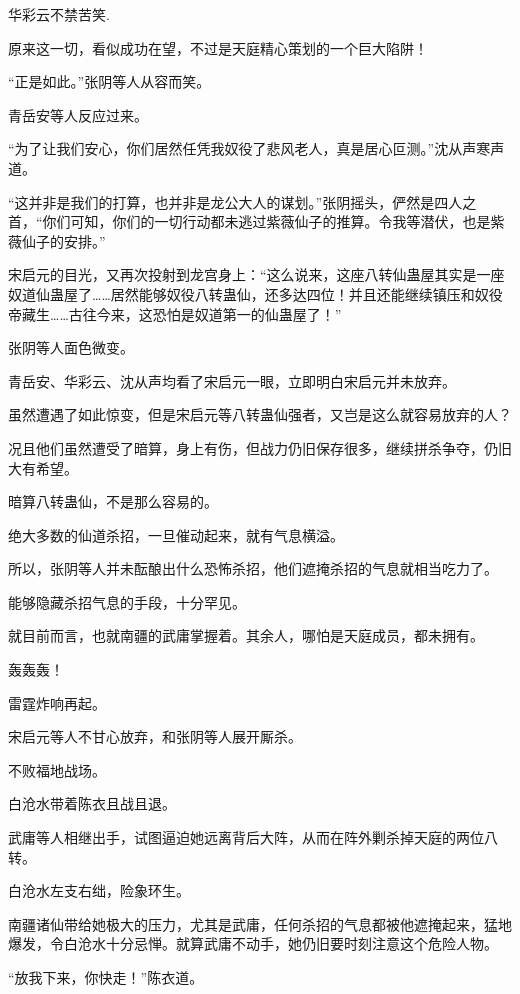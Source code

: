 
\begin{this_body}

华彩云不禁苦笑.

原来这一切，看似成功在望，不过是天庭精心策划的一个巨大陷阱！

“正是如此。”张阴等人从容而笑。

青岳安等人反应过来。

“为了让我们安心，你们居然任凭我奴役了悲风老人，真是居心叵测。”沈从声寒声道。

“这并非是我们的打算，也并非是龙公大人的谋划。”张阴摇头，俨然是四人之首，“你们可知，你们的一切行动都未逃过紫薇仙子的推算。令我等潜伏，也是紫薇仙子的安排。”

宋启元的目光，又再次投射到龙宫身上：“这么说来，这座八转仙蛊屋其实是一座奴道仙蛊屋了……居然能够奴役八转蛊仙，还多达四位！并且还能继续镇压和奴役帝藏生……古往今来，这恐怕是奴道第一的仙蛊屋了！”

张阴等人面色微变。

青岳安、华彩云、沈从声均看了宋启元一眼，立即明白宋启元并未放弃。

虽然遭遇了如此惊变，但是宋启元等八转蛊仙强者，又岂是这么就容易放弃的人？

况且他们虽然遭受了暗算，身上有伤，但战力仍旧保存很多，继续拼杀争夺，仍旧大有希望。

暗算八转蛊仙，不是那么容易的。

绝大多数的仙道杀招，一旦催动起来，就有气息横溢。

所以，张阴等人并未酝酿出什么恐怖杀招，他们遮掩杀招的气息就相当吃力了。

能够隐藏杀招气息的手段，十分罕见。

就目前而言，也就南疆的武庸掌握着。其余人，哪怕是天庭成员，都未拥有。

轰轰轰！

雷霆炸响再起。

宋启元等人不甘心放弃，和张阴等人展开厮杀。

不败福地战场。

白沧水带着陈衣且战且退。

武庸等人相继出手，试图逼迫她远离背后大阵，从而在阵外剿杀掉天庭的两位八转。

白沧水左支右绌，险象环生。

南疆诸仙带给她极大的压力，尤其是武庸，任何杀招的气息都被他遮掩起来，猛地爆发，令白沧水十分忌惮。就算武庸不动手，她仍旧要时刻注意这个危险人物。

“放我下来，你快走！”陈衣道。


\end{this_body}
